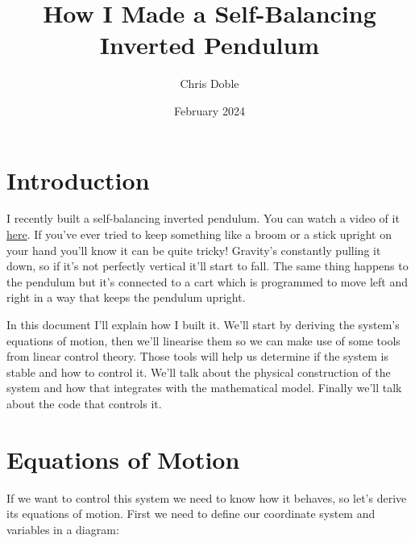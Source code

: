 \documentclass{article}
\title{How I Made a Self-Balancing Inverted Pendulum}
\author{Chris Doble}
\date{February 2024}
\begin{document}
\maketitle

\tableofcontents

\section{Introduction}

I recently built a self-balancing inverted pendulum. You can watch a video of it \href{https://www.youtube.com/watch?v=-cd6RuVWI30}{here}. If you've ever tried to keep something like a broom or a stick upright on your hand you'll know it can be quite tricky! Gravity's constantly pulling it down, so if it’s not perfectly vertical it’ll start to fall. The same thing happens to the pendulum but it's connected to a cart which is programmed to move left and right in a way that keeps the pendulum upright.

In this document I’ll explain how I built it. We'll start by deriving the system's equations of motion, then we'll linearise them so we can make use of some tools from linear control theory. Those tools will help us determine if the system is stable and how to control it. We'll talk about the physical construction of the system and how that integrates with the mathematical model. Finally we'll talk about the code that controls it.

\section{Equations of Motion}

If we want to control this system we need to know how it behaves, so let’s derive its equations of motion. First we need to define our coordinate system and variables in a diagram:

\begin{figure}[H]
  \centering
\end{figure}
\end{document}
